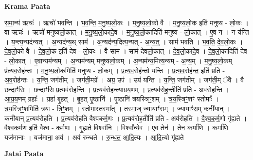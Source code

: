 \documentclass[17pt]{extarticle}
\begin{document}
\textbf{Krama Paata} \newline

स॒मा॒न्य॑ ऋचः॑ । ऋचो॑ भवन्ति । भ॒व॒न्ति॒ म॒नु॒ष्य॒लो॒कः । म॒नु॒ष्य॒लो॒को वै । म॒नु॒ष्य॒लो॒क इति॑ मनुष्य - लो॒कः । वा ऋचः॑ । ऋचो॑ मनुष्यलो॒कात् । म॒नु॒ष्य॒लो॒कादे॒व । म॒नु॒ष्य॒लो॒कादिति॑ मनुष्य - लो॒कात् । ए॒व न । न य॑न्ति । य॒न्त्य॒न्यद॑न्यत् । अ॒न्यद॑न्य॒थ् साम॑ । अ॒न्यद॑न्य॒दित्य॒न्यत् - अ॒न्य॒त्॒ । साम॑ भवति । भ॒व॒ति॒ दे॒व॒लो॒कः । दे॒व॒लो॒को वै । दे॒व॒लो॒क इति॑ देव - लो॒कः । वै साम॑ । साम॑ देवलो॒कात् । दे॒व॒लो॒कादे॒व । दे॒व॒लो॒कादिति॑ देव - लो॒कात् । ए॒वान्यम॑न्यम् । अ॒न्यम॑न्यम् मनुष्यलो॒कम् । अ॒न्यम॑न्य॒मित्य॒न्यम् - अ॒न्य॒म् । म॒नु॒ष्य॒लो॒कम् प्र॑त्यव॒रोह॑न्तः । म॒नु॒ष्य॒लो॒कमिति॑ मनुष्य - लो॒कम् । प्र॒त्य॒व॒रोह॑न्तो यन्ति । प्र॒त्य॒व॒रोह॑न्त॒ इति॑ प्रति - अ॒व॒रोह॑न्तः । य॒न्ति॒ जग॑तीम् । जग॑ती॒मग्रे᳚ । अग्र॒ उप॑ । उप॑ यन्ति । य॒न्ति॒ जग॑तीम् । जग॑ती॒म् ॅवै । वै छन्दाꣳ॑सि । छन्दाꣳ॑सि प्र॒त्यव॑रोहन्ति । प्र॒त्यव॑रोहन्त्याग्रय॒णम् । प्र॒त्यव॑रोह॒न्तीति॑ प्रति - अव॑रोहन्ति । आ॒ग्र॒य॒णम् ग्रहाः᳚ । ग्रहा॑ बृ॒हत् । बृ॒हत् पृ॒ष्ठानि॑ । पृ॒ष्ठानि॑ त्रयस्त्रिꣳ॒॒शम् । त्र॒य॒स्त्रिꣳ॒॒शꣳ स्तोमाः᳚ । त्र॒य॒स्त्रिꣳ॒॒शमिति॑ त्रयः - त्रिꣳ॒॒शम् । स्तोमा॒स्तस्मा᳚त् । तस्मा॒ज् ज्यायाꣳ॑सम् । ज्यायाꣳ॑स॒म् कनी॑यान् । कनी॑यान् प्र॒त्यव॑रोहति । प्र॒त्यव॑रोहति वैश्वकर्म॒णः । प्र॒त्यव॑रोह॒तीति॑ प्रति - अव॑रोहति । वै॒श्व॒क॒र्म॒णो गृ॑ह्यते । वै॒श्व॒क॒र्म॒ण इति॑ वैश्व - क॒र्म॒णः । गृ॒ह्य॒ते॒ विश्वा॑नि । विश्वा᳚न्ये॒व । ए॒व तेन॑ । तेन॒ कर्मा॑णि । कर्मा॑णि॒ यज॑मानाः । यज॑माना॒ अव॑ । अव॑ रुन्धते । रु॒न्ध॒त॒ आ॒दि॒त्यः । आ॒दि॒त्यो गृ॑ह्यते \newline

\textbf{Jatai Paata} \newline
\end{document}
